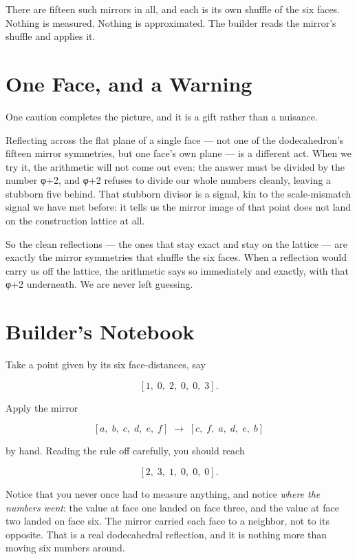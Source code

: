 There are fifteen such mirrors in all, and each is its own shuffle of the six faces. Nothing is measured. Nothing is approximated. The builder reads the mirror's shuffle and applies it.

\section*{One Face, and a Warning}

One caution completes the picture, and it is a gift rather than a nuisance.

Reflecting across the flat plane of a single face --- not one of the dodecahedron's fifteen mirror symmetries, but one face's own plane --- is a different act. When we try it, the arithmetic will not come out even: the answer must be divided by the number φ+2, and φ+2 refuses to divide our whole numbers cleanly, leaving a stubborn five behind. That stubborn divisor is a signal, kin to the scale-mismatch signal we have met before: it tells us the mirror image of that point does not land on the construction lattice at all.

So the clean reflections --- the ones that stay exact and stay on the lattice --- are exactly the mirror symmetries that shuffle the six faces. When a reflection would carry us off the lattice, the arithmetic says so immediately and exactly, with that φ+2 underneath. We are never left guessing.

\section*{Builder's Notebook}

Take a point given by its six face-distances, say

\[
[1,\;0,\;2,\;0,\;0,\;3].
\]

Apply the mirror

\[
[a,\;b,\;c,\;d,\;e,\;f]
\;\longrightarrow\;
[c,\;f,\;a,\;d,\;e,\;b]
\]

by hand. Reading the rule off carefully, you should reach

\[
[2,\;3,\;1,\;0,\;0,\;0].
\]

Notice that you never once had to measure anything, and notice \emph{where the numbers went}: the value at face one landed on face three, and the value at face two landed on face six. The mirror carried each face to a neighbor, not to its opposite. That is a real dodecahedral reflection, and it is nothing more than moving six numbers around.

